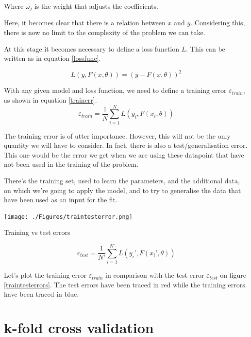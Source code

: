 \documentclass[a4paper]{tufte-book}
\newcommand{\nth}{\frac{1}{N}}
\newcommand{\sumin}{\sum_{i=1}^N}
\begin{document}
Where $\omega_j$ is the weight that adjusts the coefficients.

Here, it becomes clear that there is a relation between $x$ and $y$. Considering
this, there is now no limit to the complexity of the problem we can take.

At this stage it becomes necessary to define a loss function $L$. This can be
written as in equation \ref{lossfunc}.

\begin{equation}
    L (y, F(x, \theta)) = (y-F(x,\theta))^2
    \label{lossfunc}
\end{equation}

With any given model and loss function, we need to define a training error
$\varepsilon_{train}$, as shown in equation \ref{trainerr}.
\begin{equation}
    \varepsilon_{train} = \nth \sumin L (y_i, F(x_i,\theta))
    \label{trainerr}
\end{equation}

The training error is of utter importance. However, this will not be the only
quantity we will have to consider.
In fact, there is also a test/generalisation error. This one would be the error
we get when we are using these datapoint that have not been used in the training
of the problem.

There’s the training set, used to learn the parameters, and the additional data,
on which we’re going to apply the model, and to try to generalise the data that
have been used as an input for the fit.

\begin{marginfigure}
    \texttt{[image: ./Figures/traintesterror.png]}
    \caption{Training vs test errors}
    \label{traintesterrors}
\end{marginfigure}

\begin{equation}
    \varepsilon_{test} = \frac{1}{N’} \sum_{i=1}^{N’} L(y_i’,F(x_i’,\theta))
\end{equation}

Let's plot the training error $\varepsilon_{train}$ in comparison with the test
error $\varepsilon_{test}$ on figure \ref{traintesterrors}. The test errors have
been traced in red while the training errors have been traced in blue.

\section{k-fold cross validation}
\end{document}
